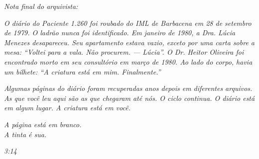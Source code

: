 \vspace{1em}

\noindent\textit{Nota final do arquivista:}

\vspace{0.5em}

\noindent\textit{O diário do Paciente 1.260 foi roubado do IML de Barbacena em 28 de setembro de 1979. O ladrão nunca foi identificado. Em janeiro de 1980, a Dra. Lúcia Menezes desapareceu. Seu apartamento estava vazio, exceto por uma carta sobre a mesa: ``Voltei para a vala. Não procurem. --- Lúcia''. O Dr. Heitor Oliveira foi encontrado morto em seu consultório em março de 1980. Ao lado do corpo, havia um bilhete: ``A criatura está em mim. Finalmente.''
}

\vspace{0.5em}

\noindent\textit{Algumas páginas do diário foram recuperadas anos depois em diferentes arquivos. As que você leu aqui são as que chegaram até nós. O ciclo continua. O diário está em algum lugar. A criatura está em você.}
\vspace{1em}

\begin{center}
\Large\textit{\textcolor{olhoamarelo}{A página está em branco.}} \\
\Large\textit{\textcolor{olhoamarelo}{A tinta é sua.}}
\end{center}

\vfill

\begin{center}
\end{center}

\newpage


\vspace*{\fill}

\begin{center}
\Large\textcolor{olhoamarelo}{\textit{3:14}}
\end{center}

\vspace*{\fill}
